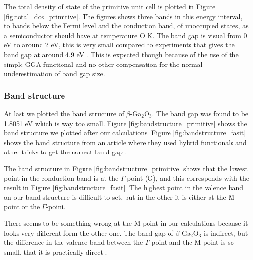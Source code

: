 The total density of state of the primitive unit cell is plotted in Figure \ref{fig:total_dos_primitive}. The figures shows three bands in this energy interval, to bands below the Fermi level and the conduction band, of unoccupied states, as a semiconductor should have at temperature O K. The band gap is visual from 0 eV to around 2 eV, this is very small compared to experiments that gives the band gap at around 4.9 eV \cite{dft_ga2o3}. This is expected though because of the use of the simple GGA functional and no other compensation for the normal underestimation of band gap size.


\subsubsection{Band structure}

At last we plotted the band structure of $\beta$-Ga$_2$O$_3$. The band gap was found to be 1.8051 eV which is way too small. Figure \ref{fig:bandstructure_primitive} shows the band structure we plotted after our calculations. Figure \ref{fig:bandstructure_fasit} shows the band structure from an article where they used hybrid functionals and other tricks to get the correct band gap \cite{dft_ga2o3}. 

The band structure in Figure \ref{fig:bandstructure_primitive} shows that the lowest point in the conduction band is at the $\Gamma$-point (G), and this corresponds with the result in Figure \ref{fig:bandstructure_fasit}. The highest point in the valence band on our band structure is difficult to set, but in the other it is either at the M-point or the $\Gamma$-point.

There seems to be something wrong at the M-point in our calculations because it looks very different form the other one. The band gap of $\beta$-Ga$_2$O$_3$ is indirect, but the difference in the valence band between the $\Gamma$-point and the M-point is so small, that it is practically direct \cite{dft_ga2o3}.

